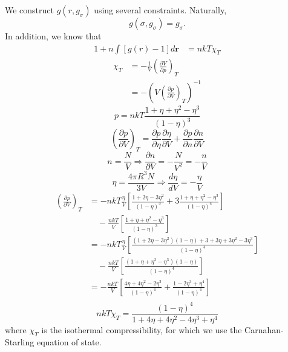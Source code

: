 \documentclass[letterpaper,twocolumn,amsmath,amssymb,pre,aps,10pt]{revtex4-1}
\newcommand{\red}[1]{{\bf \color{red} #1}}
\newcommand{\rr}{\textbf{r}}
\newcommand{\fixme}[1]{\red{[#1]}}
\begin{document}
We construct $g(r, g_\sigma)$ using several constraints.  Naturally,
\begin{equation}
  g(\sigma, g_\sigma) = g_\sigma.
\end{equation}
In addition, we know that
\begin{align}
  1 + n\int\left[g(r)-1\right]d\rr &= nkT\chi_T
\end{align}
\begin{equation}
  \begin{split}
    \chi_T  &= -\frac{1}{V}\left(\frac{\partial V}{\partial
      p}\right)_T \\
    &= - \left(V\left(\frac{\partial p}{\partial
      V}\right)_T\right)^{-1}
  \end{split}
\end{equation}
\begin{equation}
    p = nkT\frac{1+\eta+\eta^2-\eta^3}{(1-\eta)^3}
\end{equation}
\begin{equation}
    \left(\frac{\partial p}{\partial V}\right)_T = \frac{\partial p}{\partial\eta}\frac{\partial\eta}{\partial V} + \frac{\partial p}{\partial n}\frac{\partial n}{\partial V}
\end{equation}
\begin{equation}
    n = \frac{N}{V}\Longrightarrow \frac{\partial n}{\partial V} = -\frac{N}{V^2} = -\frac{n}{V}
\end{equation}
\begin{equation}
    \eta = \frac{4\pi R^3N}{3V}\Longrightarrow \frac{d\eta}{dV} = -\frac{\eta}{V}
\end{equation}
\begin{equation}
  \begin{split}
    \left(\frac{\partial p}{\partial V}\right)_T &= -nkT\frac{\eta}{V}\left[\frac{1 + 2\eta - 3\eta^2}{(1-\eta)^3} + 3\frac{1 + \eta + \eta^2 - \eta^3}{(1-\eta)^4}\right]\\
    &\quad  - \frac{nkT}{V}\left[\frac{1+\eta+\eta^2-\eta^3}{(1-\eta)^3}\right]\\
    &= -nkT\frac{\eta}{V}\left[\frac{(1+2\eta-3\eta^2)(1-\eta) + 3 + 3\eta + 3\eta^2 - 3\eta^3}{(1-\eta)^4}\right]\\
    &\quad  - \frac{nkT}{V}\left[\frac{(1+\eta+\eta^2-\eta^3)(1-\eta)}{(1-\eta)^4}\right]\\
    &= -\frac{nkT}{V}\left[\frac{4\eta + 4\eta^2 - 2\eta^3}{(1-\eta)^4} + \frac{1 - 2\eta^3 + \eta^4}{(1-\eta)^4}\right]\\
  \end{split}
\end{equation}
\begin{equation}
    nkT\chi_T = \frac{(1-\eta)^4}{1 + 4\eta + 4\eta^2 - 4\eta^3 + \eta^4}
\end{equation}
where $\chi_T$ is the isothermal compressibility, for which we use the
Carnahan-Starling equation of state.
\end{document}
